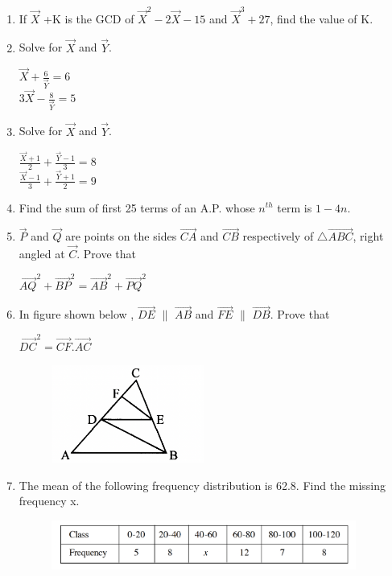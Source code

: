 \documentclass[journal,12pt,twocolumn]{IEEEtran}
\begin{document}
\begin{enumerate}
\item If $\vec{X}$ +K is the GCD of $\vec{X}^2-2\vec{X}-15$ and $\vec{X}^3+27$, find the value of K.
\item Solve for $ \vec{X} $ and $\vec{Y}$.\\ 
\begin{center}
$\vec{X}+\displaystyle\frac{6}{\vec{Y}}=6$\\
\medskip
$3\vec{X}- \displaystyle\frac{8}{\vec{Y}}=5$\\
 \end{center}
 \medskip
\item Solve for $ \vec{X} $ and $\vec{Y}$.\\ 
\begin{center}
$ \displaystyle\frac{\vec{X}+1}{2}+\displaystyle\frac{\vec{Y}-1}{3}=8$\\
\medskip
$ \displaystyle\frac{\vec{X}-1}{3}+\displaystyle\frac{\vec{Y}+1}{2}=9$\\
\end{center}
\medskip
\item Find the sum of first 25 terms of an A.P. whose $n^{th} $ term is $1-4n$.
\item $\vec{P} $ and $\vec{Q}$ are points on the sides $\vec{CA}$ and $\vec{CB}$ respectively of $\triangle\vec{ABC}$, right angled at $\vec{C}$. Prove that
\begin{center}
$\vec{AQ}^2+ \vec{BP}^2= \vec{AB}^2+\vec{PQ}^2$
\end{center}
\medskip
\item In figure shown below , $\vec{DE} $ $\|$ $\vec{AB} $ and $\vec{FE} $ $\|$ $\vec{DB} $. Prove that 
\begin{center}
$\vec{DC}^2=\vec{CF}.\vec{AC}$
\end{center}
\begin{figure}[h!]
    \centering
    \includegraphics[width=5cm]{4.png}
 \end{figure}
 \item The mean of the following frequency distribution is 62.8. Find the missing frequency x.
 \begin{figure}[h!]
    \centering
    \includegraphics[width=10cm]{5.png}

\end{figure}
\end{enumerate}
\end{document}
